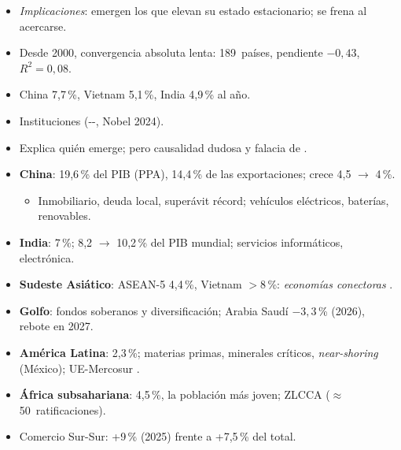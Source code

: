 \documentclass{article}
\begin{document}
\begin{columnas}
\begin{itemize}
\begin{itemize}
  \end{itemize}
\item \emph{Implicaciones}: emergen los que elevan su estado estacionario; se frena al acercarse.
\end{itemize}
\begin{itemize}
\item Desde 2000, convergencia absoluta lenta: 189~países, pendiente $-0{,}43$, $R^2=0{,}08$.
\item China 7,7\,\%, Vietnam 5,1\,\%, India 4,9\,\% al año.
\item Instituciones (--, Nobel 2024).
\end{itemize}
\begin{itemize}
\item Explica quién emerge; pero causalidad dudosa y falacia de .
\end{itemize}

\begin{itemize}
\item \textbf{China}: 19,6\,\% del PIB (PPA), 14,4\,\% de las exportaciones; crece 4,5 $\to$ 4\,\%.
  \begin{itemize}
  \item Inmobiliario, deuda local, superávit récord; vehículos eléctricos, baterías, renovables.
  \end{itemize}
\item \textbf{India}: 7\,\%; 8,2 $\to$ 10,2\,\% del PIB mundial; servicios informáticos, electrónica.
\item \textbf{Sudeste Asiático}: ASEAN-5 4,4\,\%, Vietnam $>$8\,\%: \emph{economías conectoras} .
\item \textbf{Golfo}: fondos soberanos y diversificación; Arabia Saudí $-3{,}3$\,\% (2026), rebote en 2027.
\item \textbf{América Latina}: 2,3\,\%; materias primas, minerales críticos, \emph{near-shoring} (México); UE-Mercosur .
\item \textbf{África subsahariana}: 4,5\,\%, la población más joven; ZLCCA ($\approx$50~ratificaciones).
\item Comercio Sur-Sur: +9\,\% (2025) frente a +7,5\,\% del total.
\end{itemize}


\end{columnas}
\end{document}
